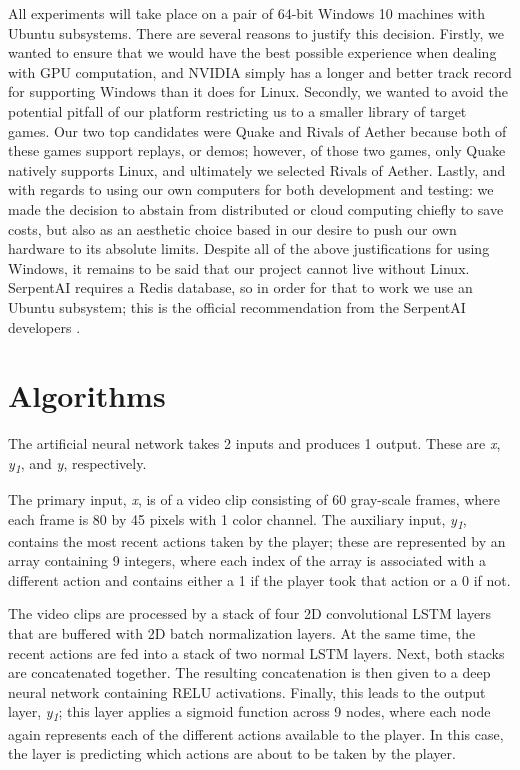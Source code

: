 All experiments will take place on a pair of 64-bit Windows 10 machines with Ubuntu subsystems. There are several reasons to justify this decision. Firstly, we wanted to ensure that we would have the best possible experience when dealing with GPU computation, and NVIDIA simply has a longer and better track record for supporting Windows than it does for Linux. Secondly, we wanted to avoid the potential pitfall of our platform restricting us to a smaller library of target games. Our two top candidates were Quake and Rivals of Aether because both of these games support replays, or demos; however, of those two games, only Quake natively supports Linux, and ultimately we selected Rivals of Aether. Lastly, and with regards to using our own computers for both development and testing: we made the decision to abstain from distributed or cloud computing chiefly to save costs, but also as an aesthetic choice based in our desire to push our own hardware to its absolute limits. Despite all of the above justifications for using Windows, it remains to be said that our project cannot live without Linux. SerpentAI requires a Redis database, so in order for that to work we use an Ubuntu subsystem; this is the official recommendation from the SerpentAI developers \cite{SerpentAI}.




\section{Algorithms}

The artificial neural network takes 2 inputs and produces 1 output. These are \textit{x}, \textit{y\textsubscript{1}}, and \textit{y}, respectively.

The primary input, \textit{x}, is of a video clip consisting of 60 gray-scale frames, where each frame is 80 by 45 pixels with 1 color channel. The auxiliary input, \textit{y\textsubscript{1}}, contains the most recent actions taken by the player; these are represented by an array containing 9 integers, where each index of the array is associated with a different action and contains either a 1 if the player took that action or a 0 if not.

The video clips are processed by a stack of four 2D convolutional LSTM layers that are buffered with 2D batch normalization layers. At the same time, the recent actions are fed into a stack of two normal LSTM layers. Next, both stacks are concatenated together. The resulting concatenation is then given to a deep neural network containing RELU activations. Finally, this leads to the output layer, \textit{y\textsubscript{1}}; this layer applies a sigmoid function across 9 nodes, where each node again represents each of the different actions available to the player. In this case, the layer is predicting which actions are about to be taken by the player.

